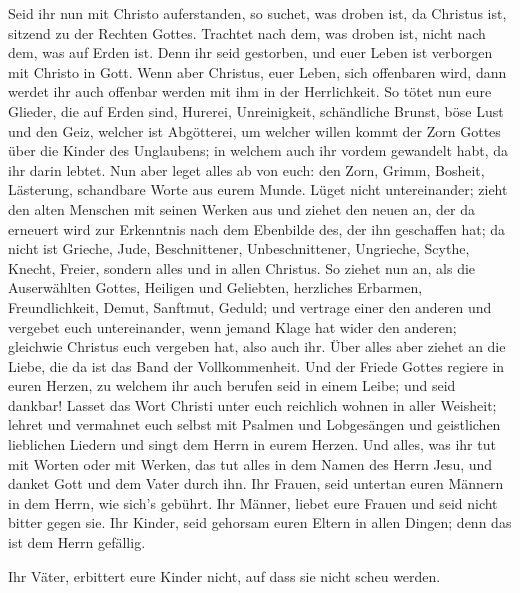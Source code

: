  Seid ihr nun mit Christo auferstanden, so suchet, was
droben ist, da Christus ist, sitzend zu der Rechten Gottes.
 Trachtet nach dem, was droben ist, nicht nach dem, was
auf Erden ist.  Denn ihr seid gestorben, und euer Leben
ist verborgen mit Christo in Gott.  Wenn aber Christus,
euer Leben, sich offenbaren wird, dann werdet ihr auch offenbar werden
mit ihm in der Herrlichkeit.  So tötet nun eure Glieder,
die auf Erden sind, Hurerei, Unreinigkeit, schändliche Brunst, böse Lust
und den Geiz, welcher ist Abgötterei,  um welcher willen
kommt der Zorn Gottes über die Kinder des Unglaubens;  in
welchem auch ihr vordem gewandelt habt, da ihr darin lebtet.
 Nun aber leget alles ab von euch: den Zorn, Grimm,
Bosheit, Lästerung, schandbare Worte aus eurem Munde. 
Lüget nicht untereinander; zieht den alten Menschen mit seinen Werken
aus  und ziehet den neuen an, der da erneuert wird zur
Erkenntnis nach dem Ebenbilde des, der ihn geschaffen hat;
 da nicht ist Grieche, Jude, Beschnittener,
Unbeschnittener, Ungrieche, Scythe, Knecht, Freier, sondern alles und in
allen Christus.  So ziehet nun an, als die Auserwählten
Gottes, Heiligen und Geliebten, herzliches Erbarmen, Freundlichkeit,
Demut, Sanftmut, Geduld;  und vertrage einer den anderen
und vergebet euch untereinander, wenn jemand Klage hat wider den
anderen; gleichwie Christus euch vergeben hat, also auch ihr.
 Über alles aber ziehet an die Liebe, die da ist das Band
der Vollkommenheit.  Und der Friede Gottes regiere in
euren Herzen, zu welchem ihr auch berufen seid in einem Leibe; und seid
dankbar!  Lasset das Wort Christi unter euch reichlich
wohnen in aller Weisheit; lehret und vermahnet euch selbst mit Psalmen
und Lobgesängen und geistlichen lieblichen Liedern und singt dem Herrn
in eurem Herzen.  Und alles, was ihr tut mit Worten oder
mit Werken, das tut alles in dem Namen des Herrn Jesu, und danket Gott
und dem Vater durch ihn.  Ihr Frauen, seid untertan euren
Männern in dem Herrn, wie sich's gebührt.  Ihr Männer,
liebet eure Frauen und seid nicht bitter gegen sie.  Ihr
Kinder, seid gehorsam euren Eltern in allen Dingen; denn das ist dem
Herrn gefällig.

 Ihr Väter, erbittert eure Kinder nicht, auf dass sie
nicht scheu werden.

